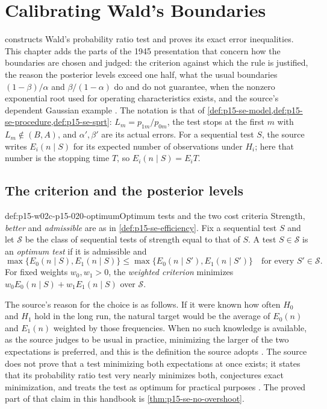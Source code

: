 \chapter{Calibrating Wald's Boundaries}
\label{sec:p15-w02c-p15-020-calibration}

 constructs Wald's probability
ratio test and proves its exact error inequalities. This chapter
adds the parts of the 1945 presentation that concern how the
boundaries are chosen and judged: the criterion against which the
rule is justified, the reason the posterior levels exceed one half,
what the usual boundaries \((1-\beta)/\alpha\) and \(\beta/(1-\alpha)\)
do and do not guarantee, when the nonzero exponential root used for
operating characteristics exists, and the source's dependent Gaussian
example \cite[Sections 2.2--3.4]{Wald1945SequentialTests}.
The notation is that of \cref{def:p15-se-model,def:p15-se-procedure,def:p15-se-sprt}:
\(L_m=p_{1m}/p_{0m}\), the test stops at the first \(m\) with
\(L_m\notin(B,A)\), and \(\alpha',\beta'\) are its actual errors.
For a sequential test \(S\), the source writes \(E_i(n\mid S)\) for
its expected number of observations under \(H_i\); here that number
is the stopping time \(T\), so \(E_i(n\mid S)=E_iT\).

\section{The criterion and the posterior levels}
\label{sec:p15-w02c-p15-020-criteria}

\begin{hbdefinition}{def:p15-w02c-p15-020-optimum}{Optimum tests and the two cost criteria}
Strength, \emph{better} and \emph{admissible} are as in
\cref{def:p15-se-efficiency}. Fix a sequential test \(S\) and let
\(\mathcal S\) be the class of sequential tests of strength equal to
that of \(S\). A test \(S\in\mathcal S\) is an \emph{optimum test}
if it is admissible and
\[
 \max\{E_0(n\mid S),E_1(n\mid S)\}\leq
 \max\{E_0(n\mid S'),E_1(n\mid S')\}
 \quad\text{for every }S'\in\mathcal S .
\]
For fixed weights \(w_0,w_1>0\), the \emph{weighted criterion}
minimizes \(w_0E_0(n\mid S)+w_1E_1(n\mid S)\) over \(\mathcal S\).

The source's reason for the choice is as follows. If it were known how
often \(H_0\) and \(H_1\) hold in the long run, the natural target
would be the average of \(E_0(n)\) and \(E_1(n)\) weighted by those
frequencies. When no such knowledge is available, as the source
judges to be usual in practice, minimizing the larger of the two
expectations is preferred, and this is the definition the source
adopts \cite[Section 2.2, p.~124]{Wald1945SequentialTests}.
The source does not prove that a test minimizing both expectations at
once exists; it states that its probability ratio test very nearly
minimizes both, conjectures exact minimization, and treats the test as
optimum for practical purposes
\cite[Section 2.2, p.~124, footnote 4; Section 3.1, p.~127, footnote 8]{Wald1945SequentialTests}.
The proved part of that claim in this handbook is
\cref{thm:p15-se-no-overshoot}.
\end{hbdefinition}

